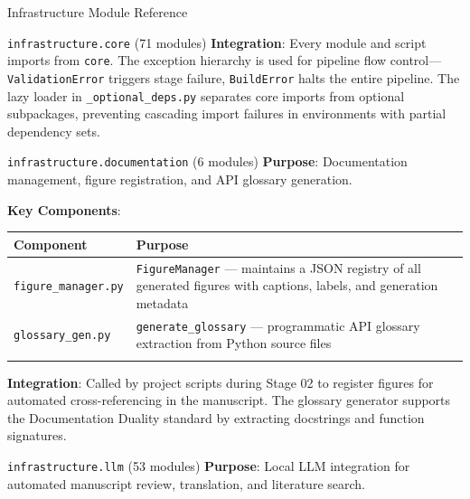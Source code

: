\documentclass[
  ignorenonframetext,
]{beamer}
\newcounter{none} %
\begin{document}
\begin{frame}[fragile]{Infrastructure Module Reference}
\begin{block}{\texttt{infrastructure.core} (71 modules)}
\textbf{Integration}: Every module and script imports from
\texttt{core}. The exception hierarchy is used for pipeline flow
control---\texttt{ValidationError} triggers stage failure,
\texttt{BuildError} halts the entire pipeline. The lazy loader in
\texttt{\_optional\_deps.py} separates core imports from optional
subpackages, preventing cascading import failures in environments with
partial dependency sets.
\end{block}

\begin{block}{\texttt{infrastructure.documentation} (6 modules)}
\protect{}\label{infrastructure.documentation-6-modules}
\textbf{Purpose}: Documentation management, figure registration, and API
glossary generation.

\textbf{Key Components}:

{\def\LTcaptype{none} %
\begin{longtable}[]{@{}
  >{\raggedright\arraybackslash}p{}
  >{\raggedright\arraybackslash}p{}@{}}
\toprule\noalign{}
\begin{minipage}[b]{\linewidth}\raggedright
Component
\end{minipage} & \begin{minipage}[b]{\linewidth}\raggedright
Purpose
\end{minipage} \\
\midrule\noalign{}
\endhead
\texttt{figure\_manager.py} & \texttt{FigureManager} --- maintains a
JSON registry of all generated figures with captions, labels, and
generation metadata \\
\texttt{glossary\_gen.py} & \texttt{generate\_glossary} --- programmatic
API glossary extraction from Python source files \\
\bottomrule\noalign{}
\end{longtable}
}

\textbf{Integration}: Called by project scripts during Stage 02 to
register figures for automated cross-referencing in the manuscript. The
glossary generator supports the Documentation Duality standard by
extracting docstrings and function signatures.
\end{block}

\begin{block}{\texttt{infrastructure.llm} (53 modules)}
\protect{}\label{infrastructure.llm-53-modules}
\textbf{Purpose}: Local LLM integration for automated manuscript review,
translation, and literature search.


\end{block}
\end{frame}
\end{document}
